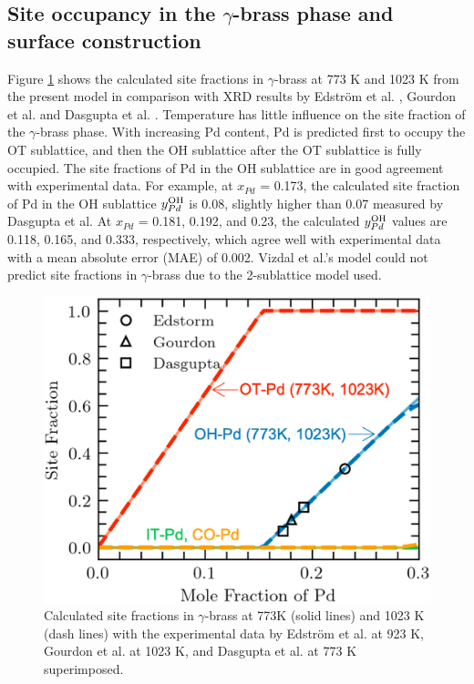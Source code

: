 \subsection{Site occupancy in the $\gamma$-brass phase and surface construction} \label{intermetallics:ssec:PdZnsite}
Figure \ref{intermetallics:fig:PdZnSOC} shows the calculated site fractions in $\gamma$-brass at 773 K and 1023 K from the present model in comparison with XRD results by Edström et al. \cite{strom1969x}, Gourdon et al. \cite{gourdon2006intergrowth} and Dasgupta et al. \cite{Dasgupta2022}. Temperature has little influence on the site fraction of the $\gamma$-brass phase. With increasing Pd content, Pd is predicted first to occupy the OT sublattice, and then the OH sublattice after the OT sublattice is fully occupied. The site fractions of Pd in the OH sublattice are in good agreement with experimental data. For example, at $x_{Pd}$ = 0.173, the calculated site fraction of Pd in the OH sublattice $y_{Pd}^{\rm OH}$ is 0.08, slightly higher than 0.07 measured by Dasgupta et al.\cite{Dasgupta2022} At $x_{Pd}$ = 0.181, 0.192, and 0.23, the calculated $y_{Pd}^{\rm OH}$ values are 0.118, 0.165, and 0.333, respectively, which agree well with experimental data with a mean absolute error (MAE) of 0.002. Vizdal et al.'s \cite{vizdal2006experimental} model could not predict site fractions in $\gamma$-brass due to the 2-sublattice model used.

\begin{figure}[H]
    \centering
    \includegraphics[width=0.5\linewidth]{intermetallics/Intermetallics-PdZnSOC.jpg}
    \caption{Calculated site fractions in $\gamma$-brass at 773K (solid lines) and 1023 K (dash lines) with the experimental data by Edström et al. \cite{strom1969x} at 923 K, Gourdon et al. \cite{gourdon2006intergrowth} at 1023 K, and Dasgupta et al. \cite{Dasgupta2022} at 773 K superimposed.}
    \label{intermetallics:fig:PdZnSOC}
\end{figure}

